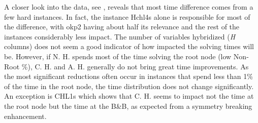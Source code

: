 \documentclass[ppgc,tese,english,formais,babel]{iiufrgs}
\begin{document}
A closer look into the data, see , reveals that most time difference comes from a few hard instances.
In fact, the instance Hchl4s alone is responsible for most of the difference, with okp2 having about half its relevance and the rest of the instances considerably less impact.
The number of variables hybridized (\emph{H} columns) does not seem a good indicator of how impacted the solving times will be.
However, if N. H. spends most of the time solving the root node (low Non-Root \%), C. H. and A. H. generally do not bring great time improvements.
As the most significant reductions often occur in instances that spend less than 1\% of the time in the root node, the time distribution does not change significantly.
An exception is CHL1s which shows that C. H. seems to impact not the time at the root node but the time at the B\&B, as expected from a symmetry breaking enhancement.
\end{document}
